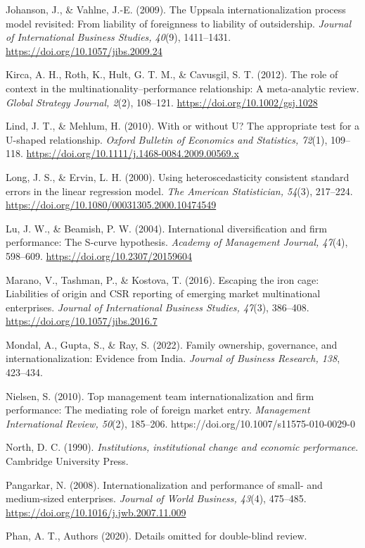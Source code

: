 \documentclass[
  12pt,a4paper]{article}
\begin{document}
Johanson, J., \& Vahlne, J.-E. (2009). The Uppsala internationalization
process model revisited: From liability of foreignness to liability of
outsidership. \emph{Journal of International Business Studies, 40}(9),
1411--1431. \url{https://doi.org/10.1057/jibs.2009.24}

Kirca, A. H., Roth, K., Hult, G. T. M., \& Cavusgil, S. T. (2012). The
role of context in the multinationality--performance relationship: A
meta-analytic review. \emph{Global Strategy Journal, 2}(2), 108--121.
\url{https://doi.org/10.1002/gsj.1028}

Lind, J. T., \& Mehlum, H. (2010). With or without U? The appropriate
test for a U-shaped relationship. \emph{Oxford Bulletin of Economics and
Statistics, 72}(1), 109--118.
\url{https://doi.org/10.1111/j.1468-0084.2009.00569.x}

Long, J. S., \& Ervin, L. H. (2000). Using heteroscedasticity consistent
standard errors in the linear regression model. \emph{The American
Statistician, 54}(3), 217--224.
\url{https://doi.org/10.1080/00031305.2000.10474549}

Lu, J. W., \& Beamish, P. W. (2004). International diversification and
firm performance: The S-curve hypothesis. \emph{Academy of Management
Journal, 47}(4), 598--609. \url{https://doi.org/10.2307/20159604}

Marano, V., Tashman, P., \& Kostova, T. (2016). Escaping the iron cage:
Liabilities of origin and CSR reporting of emerging market multinational
enterprises. \emph{Journal of International Business Studies, 47}(3),
386--408. \url{https://doi.org/10.1057/jibs.2016.7}

Mondal, A., Gupta, S., \& Ray, S. (2022). Family ownership, governance,
and internationalization: Evidence from India. \emph{Journal of Business
Research, 138}, 423--434.

Nielsen, S. (2010). Top management team internationalization and firm
performance: The mediating role of foreign market entry.
\emph{Management International Review, 50}(2), 185--206.
https://doi.org/10.1007/s11575-010-0029-0

North, D. C. (1990). \emph{Institutions, institutional change and
economic performance}. Cambridge University Press.

Pangarkar, N. (2008). Internationalization and performance of small- and
medium-sized enterprises. \emph{Journal of World Business, 43}(4),
475--485. \url{https://doi.org/10.1016/j.jwb.2007.11.009}

Phan, A. T., Authors (2020). Details omitted for double-blind review.
\end{document}
